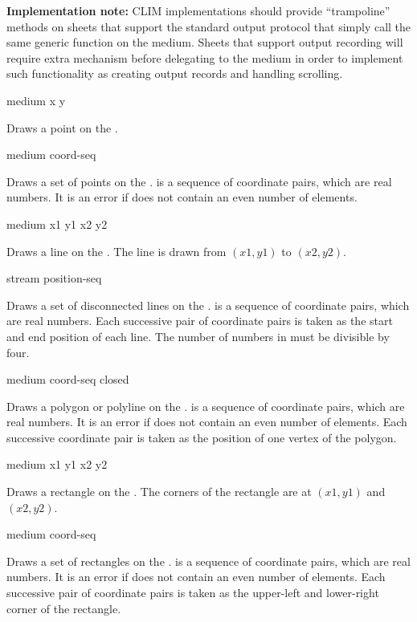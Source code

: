 {\bf Implementation note:} CLIM implementations should provide ``trampoline''
methods on sheets that support the standard output protocol that simply call the
same generic function on the medium.  Sheets that support output recording will
require extra mechanism before delegating to the medium in order to implement
such functionality as creating output records and handling scrolling.

 {medium x y}

Draws a point on the  .  

 {medium coord-seq}

Draws a set of points on the  .   is a
sequence of coordinate pairs, which are real numbers.  It is an error if
 does not contain an even number of elements.

 {medium x1 y1 x2 y2}

Draws a line on the  .  The line is drawn from
$(x1,y1)$ to $(x2,y2)$.

 {stream position-seq} 

Draws a set of disconnected lines on the  .
 is a sequence of coordinate pairs, which are real numbers.  Each
successive pair of coordinate pairs is taken as the start and end position of
each line. The number of numbers in  must be divisible by four.

 {medium coord-seq closed}

Draws a polygon or polyline on the  .  
is a sequence of coordinate pairs, which are real numbers.  It is an error if
 does not contain an even number of elements.  Each successive
coordinate pair is taken as the position of one vertex of the polygon.

 {medium x1 y1 x2 y2}

Draws a rectangle on the  .  The corners of the
rectangle are at $(x1,y1)$ and $(x2,y2)$.

 {medium coord-seq}

Draws a set of rectangles on the  .   is
a sequence of coordinate pairs, which are real numbers.  It is an error if
 does not contain an even number of elements.  Each successive
pair of coordinate pairs is taken as the upper-left and lower-right corner of
the rectangle.

